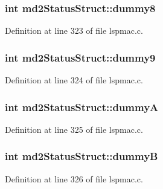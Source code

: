 \hypertarget{structmd2StatusStruct_a17f44367cfa4c66ec3ee481863ef4960}{
\subsubsection[{dummy8}]{\setlength{\rightskip}{0pt plus 5cm}int md2\-Status\-Struct\-::dummy8}}\label{structmd2StatusStruct_a17f44367cfa4c66ec3ee481863ef4960}


Definition at line 323 of file lspmac.\-c.

\hypertarget{structmd2StatusStruct_aa5aadda5a5cb98c6028f8b45e16cd084}{
\subsubsection[{dummy9}]{\setlength{\rightskip}{0pt plus 5cm}int md2\-Status\-Struct\-::dummy9}}\label{structmd2StatusStruct_aa5aadda5a5cb98c6028f8b45e16cd084}


Definition at line 324 of file lspmac.\-c.

\hypertarget{structmd2StatusStruct_a9fc7dc802d00c22463dd7ddd531e06d7}{
\subsubsection[{dummy\-A}]{\setlength{\rightskip}{0pt plus 5cm}int md2\-Status\-Struct\-::dummy\-A}}\label{structmd2StatusStruct_a9fc7dc802d00c22463dd7ddd531e06d7}


Definition at line 325 of file lspmac.\-c.

\hypertarget{structmd2StatusStruct_aab597be69a8dcc140778d9aeb8a50eee}{
\subsubsection[{dummy\-B}]{\setlength{\rightskip}{0pt plus 5cm}int md2\-Status\-Struct\-::dummy\-B}}\label{structmd2StatusStruct_aab597be69a8dcc140778d9aeb8a50eee}


Definition at line 326 of file lspmac.\-c.


